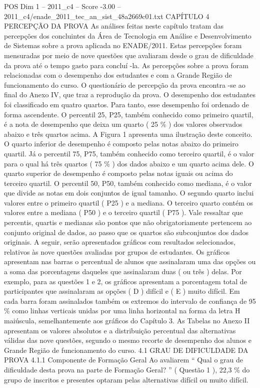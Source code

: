 \begin{textsample}{POS Dim 1 – 2011\_c4 – Score -3.00 – 2011\_c4/enade\_2011\_tec\_an\_sist\_48a2669c01.txt}  \label{ex:f1_pos_327}
CAPÍTULO 4 PERCEPÇÃO DA PROVA As análises feitas neste capítulo tratam das percepções dos concluintes da Área de Tecnologia em Análise e Desenvolvimento de Sistemas sobre a prova aplicada no ENADE/2011.
Estas percepções foram mensuradas por meio de nove questões que avaliaram desde o grau de dificuldade da prova até o tempo gasto para concluí -la.
As percepções sobre a prova foram relacionadas com o desempenho dos estudantes e com a Grande Região de funcionamento do curso.
O questionário de percepção da prova encontra -se ao final do Anexo IV, que traz a reprodução da prova.
O desempenho dos estudantes foi classificado em quatro quartos.
Para tanto, esse desempenho foi ordenado de forma ascendente.
O percentil 25, P25, também conhecido como primeiro quartil, é a nota de desempenho que deixa um quarto ( 25 \% ) dos valores observados abaixo e três quartos acima.
A Figura 1 apresenta uma ilustração deste conceito.
O quarto inferior de desempenho é composto pelas notas abaixo do primeiro quartil.
Já o percentil 75, P75, também conhecido como terceiro quartil, é o valor para o qual há três quartos ( 75 \% ) dos dados abaixo e um quarto acima dele.
O quarto superior de desempenho é composto pelas notas iguais ou acima do terceiro quartil.
O percentil 50, P50, também conhecido como mediana, é o valor que divide as notas em dois conjuntos de igual tamanho.
O segundo quarto inclui valores entre o primeiro quartil ( P25 ) e a mediana.
O terceiro quarto contém os valores entre a mediana ( P50 ) e o terceiro quartil ( P75 ).
Vale ressaltar que percentis, quartis e medianas são pontos que não obrigatoriamente pertencem ao conjunto original de dados, ao passo que os quartos são subconjuntos dos dados originais.
A seguir, serão apresentados gráficos com resultados selecionados, relativos às nove questões avaliadas por grupos de estudantes.
Os gráficos apresentam nas barras o percentual de alunos que assinalaram uma das opções ou a soma das porcentagens daqueles que assinalaram duas ( ou três ) delas.
Por exemplo, para as questões 1 e 2, os gráficos apresentam a porcentagem total de participantes que assinalaram as opções ( D ) difícil e ( E ) muito difícil.
Em cada barra foram assinalados também os extremos do intervalo de confiança de 95 \% como linhas verticais unidas por uma linha horizontal na forma da letra H maiúscula, semelhantemente aos gráficos do Capítulo 3.
As Tabelas no Anexo II apresentam os valores absolutos e a distribuição percentual das alternativas válidas das nove questões, segundo o mesmo recorte de desempenho dos alunos e Grande Região de funcionamento do curso. 4.1 GRAU DE DIFICULDADE DA PROVA 4.1.1 Componente de Formação Geral Ao avaliarem “ Qual o grau de dificuldade desta prova na parte de Formação Geral? ” ( Questão 1 ), 22,3 \% do grupo de inscritos e presentes optaram pelas alternativas difícil ou muito difícil.

\end{textsample}
